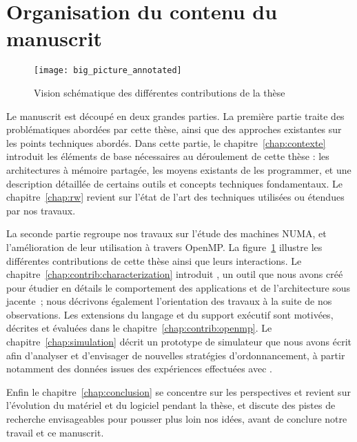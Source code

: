 \section{Organisation du contenu du manuscrit}\label{sec:intro:outline}

\begin{figure}[h!]
  \centering
  \texttt{[image: big\_picture\_annotated]}
  \caption{Vision schématique des différentes contributions de la thèse}\label{fig:intro:big_picture_annotated}
\end{figure}

Le manuscrit est découpé en deux grandes parties.
La première partie traite des problématiques abordées par cette thèse, ainsi que des approches existantes sur les points techniques abordés.
Dans cette partie, le chapitre~\ref{chap:contexte} introduit les éléments de base nécessaires au déroulement de cette thèse : les architectures à mémoire partagée, les moyens existants de les programmer, et une description détaillée de certains outils et concepts techniques fondamentaux.
Le chapitre~\ref{chap:rw} revient sur l'état de l'art des techniques utilisées ou étendues par nos travaux.

La seconde partie regroupe nos travaux sur l'étude des machines NUMA, et l'amélioration de leur utilisation à travers OpenMP.
La figure~\ref{fig:intro:big_picture_annotated} illustre les différentes contributions de cette thèse ainsi que leurs interactions.
Le chapitre~\ref{chap:contrib:characterization} introduit \outil, un outil que nous avons créé pour étudier en détails le comportement des applications et de l'architecture sous jacente~; nous décrivons également l'orientation des travaux à la suite de nos observations.
Les extensions du langage et du support exécutif sont motivées, décrites et évaluées dans le chapitre~\ref{chap:contrib:openmp}.
Le chapitre~\ref{chap:simulation} décrit un prototype de simulateur que nous avons écrit afin d'analyser et d'envisager de nouvelles stratégies d'ordonnancement, à partir notamment des données issues des expériences effectuées avec \outil.

Enfin le chapitre~\ref{chap:conclusion} se concentre sur les perspectives et revient sur l'évolution du matériel et du logiciel pendant la thèse, et discute des pistes de recherche envisageables pour pousser plus loin nos idées, avant de conclure notre travail et ce manuscrit.
